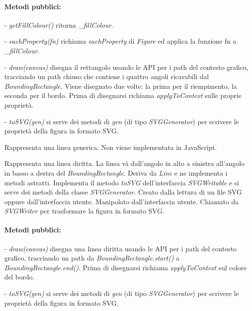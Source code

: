 \paragraph{Metodi pubblici:}
\begin{elencopuntato}[\normindent]
\item[-] \textit{getFillColour()} ritorna \textit{{\_}fillColour}.
\item[-] \textit{eachProperty(fn)} richiama \textit{eachProperty} di \textit{Figure} ed applica la funzione fn a \textit{{\_}fillColour}.
\item[-] \textit{draw(canvas)} disegna il rettangolo usando le API per i path del contesto grafico, tracciando un path chiuso che contiene i quattro angoli ricavabili dal \textit{BoundingRectangle}. Viene disegnato due volte: la prima per il riempimento, la seconda per il bordo. Prima di disegnarsi richiama \textit{applyToContext} sulle proprie propriet\`a.
\item[-] \textit{toSVG(gen)} si serve dei metodi di \textit{gen} (di tipo \textit{SVGGenerator}) per scrivere le propriet\`a della figura in formato SVG.
\end{elencopuntato}

Rappresenta una linea generica. Non viene implementata in JavaScript.

Rappresenta una linea diritta. La linea v\`a dall'angolo in alto a sinistra all'angolo in basso a destra del \textit{BoundingRectangle}.
Deriva da \textit{Line} e ne implementa i metodi astratti. Implementa il metodo \textit{toSVG} dell'interfaccia \textit{SVGWritable} e si serve dei metodi della classe \textit{SVGGenerator}.
Creato dalla lettura di un file SVG oppure dall'interfaccia utente. Manipolato dall'interfaccia utente. Chiamato da \textit{SVGWriter} per trasformare la figura in formato SVG.
\paragraph{Metodi pubblici:}
\begin{elencopuntato}[\normindent]
\item[-] \textit{draw(canvas)} disegna una linea diritta usando le API per i path del contesto grafico, tracciando un path da \textit{BoundingRectangle.start()} a \textit{BoundingRectangle.end()}. Prima di disegnarsi richiama \textit{applyToContext} sul colore del bordo.
\item[-] \textit{toSVG(gen)} si serve dei metodi di \textit{gen} (di tipo \textit{SVGGenerator}) per scrivere le propriet\`a della figura in formato SVG.
\end{elencopuntato}

